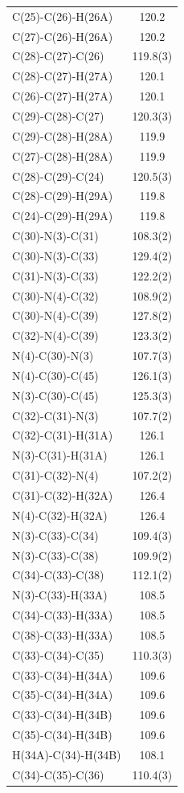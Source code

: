 \begin{center}
{\begin{supertabular}{p{1.5in}c}
C(25)-C(26)-H(26A)&120.2\\
C(27)-C(26)-H(26A)&120.2\\
C(28)-C(27)-C(26)&119.8(3)\\
C(28)-C(27)-H(27A)&120.1\\
C(26)-C(27)-H(27A)&120.1\\
C(29)-C(28)-C(27)&120.3(3)\\
C(29)-C(28)-H(28A)&119.9\\
C(27)-C(28)-H(28A)&119.9\\
C(28)-C(29)-C(24)&120.5(3)\\
C(28)-C(29)-H(29A)&119.8\\
C(24)-C(29)-H(29A)&119.8\\
C(30)-N(3)-C(31)&108.3(2)\\
C(30)-N(3)-C(33)&129.4(2)\\
C(31)-N(3)-C(33)&122.2(2)\\
C(30)-N(4)-C(32)&108.9(2)\\
C(30)-N(4)-C(39)&127.8(2)\\
C(32)-N(4)-C(39)&123.3(2)\\
N(4)-C(30)-N(3)&107.7(3)\\
N(4)-C(30)-C(45)&126.1(3)\\
N(3)-C(30)-C(45)&125.3(3)\\
C(32)-C(31)-N(3)&107.7(2)\\
C(32)-C(31)-H(31A)&126.1\\
N(3)-C(31)-H(31A)&126.1\\
C(31)-C(32)-N(4)&107.2(2)\\
C(31)-C(32)-H(32A)&126.4\\
N(4)-C(32)-H(32A)&126.4\\
N(3)-C(33)-C(34)&109.4(3)\\
N(3)-C(33)-C(38)&109.9(2)\\
C(34)-C(33)-C(38)&112.1(2)\\
N(3)-C(33)-H(33A)&108.5\\
C(34)-C(33)-H(33A)&108.5\\
C(38)-C(33)-H(33A)&108.5\\
C(33)-C(34)-C(35)&110.3(3)\\
C(33)-C(34)-H(34A)&109.6\\
C(35)-C(34)-H(34A)&109.6\\
C(33)-C(34)-H(34B)&109.6\\
C(35)-C(34)-H(34B)&109.6\\
H(34A)-C(34)-H(34B)&108.1\\
C(34)-C(35)-C(36)&110.4(3)\\

\end{supertabular}}
\end{center}
